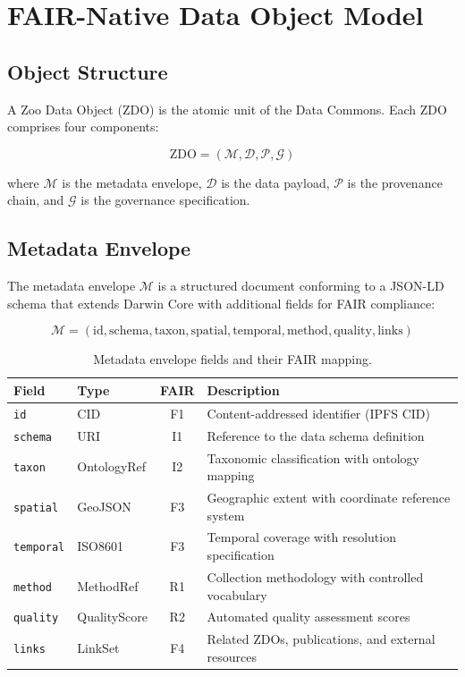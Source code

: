 \section{FAIR-Native Data Object Model}

\label{sec:data_model}

\subsection{Object Structure}

A Zoo Data Object (ZDO) is the atomic unit of the Data Commons.
Each ZDO comprises four components:

\begin{equation}
    \text{ZDO} = (\mathcal{M}, \mathcal{D}, \mathcal{P}, \mathcal{G})
\end{equation}

\noindent where $\mathcal{M}$ is the metadata envelope, $\mathcal{D}$ is the data payload, $\mathcal{P}$ is the provenance chain, and $\mathcal{G}$ is the governance specification.

\subsection{Metadata Envelope}

The metadata envelope $\mathcal{M}$ is a structured document conforming to a JSON-LD schema that extends Darwin Core with additional fields for FAIR compliance:

\begin{equation}
    \mathcal{M} = (\text{id}, \text{schema}, \text{taxon}, \text{spatial}, \text{temporal}, \text{method}, \text{quality}, \text{links})
\end{equation}

\begin{table}[H]
\centering
\caption{Metadata envelope fields and their FAIR mapping.}
\label{tab:metadata}
\begin{tabularx}{\textwidth}{@{}llcX@{}}
\toprule
\textbf{Field} & \textbf{Type} & \textbf{FAIR} & \textbf{Description} \\
\midrule
\texttt{id} & CID & F1 & Content-addressed identifier (IPFS CID) \\
\texttt{schema} & URI & I1 & Reference to the data schema definition \\
\texttt{taxon} & OntologyRef & I2 & Taxonomic classification with ontology mapping \\
\texttt{spatial} & GeoJSON & F3 & Geographic extent with coordinate reference system \\
\texttt{temporal} & ISO8601 & F3 & Temporal coverage with resolution specification \\
\texttt{method} & MethodRef & R1 & Collection methodology with controlled vocabulary \\
\texttt{quality} & QualityScore & R2 & Automated quality assessment scores \\
\texttt{links} & LinkSet & F4 & Related ZDOs, publications, and external resources \\
\bottomrule
\end{tabularx}
\end{table}

